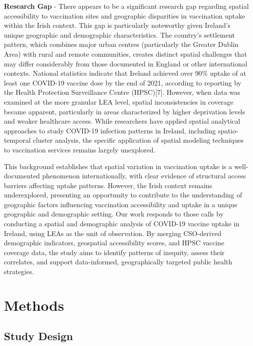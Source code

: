 \documentclass{article}
\begin{document}
\textbf{Research Gap} - There appears to be a significant research gap
regarding spatial accessibility to vaccination sites and geographic
disparities in vaccination uptake within the Irish context. This gap is
particularly noteworthy given Ireland's unique geographic and
demographic characteristics. The country's settlement pattern, which
combines major urban centres (particularly the Greater Dublin Area) with
rural and remote communities, creates distinct spatial challenges that
may differ considerably from those documented in England or other
international contexts. National statistics indicate that Ireland
achieved over 90\% uptake of at least one COVID-19 vaccine dose by the
end of 2021, according to reporting by the Health Protection
Surveillance Centre (HPSC){[}7{]}. However, when data was examined at
the more granular LEA level, spatial inconsistencies in coverage became
apparent, particularly in areas characterized by higher deprivation
levels and weaker healthcare access. While researchers have applied
spatial analytical approaches to study COVID-19 infection patterns in
Ireland, including spatio-temporal cluster analysis, the specific
application of spatial modeling techniques to vaccination services
remains largely unexplored.

This background establishes that spatial variation in vaccination uptake
is a well-documented phenomenon internationally, with clear evidence of
structural access barriers affecting uptake patterns. However, the Irish
context remains underexplored, presenting an opportunity to contribute
to the understanding of geographic factors influencing vaccination
accessibility and uptake in a unique geographic and demographic setting.
Our work responds to those calls by conducting a spatial and demographic
analysis of COVID-19 vaccine uptake in Ireland, using LEAs as the unit
of observation. By merging CSO-derived demographic indicators,
geospatial accessibility scores, and HPSC vaccine coverage data, the
study aims to identify patterns of inequity, assess their correlates,
and support data-informed, geographically targeted public health
strategies.

\section{Methods}\label{methods}

\subsection{Study Design}\label{study-design}
\end{document}
